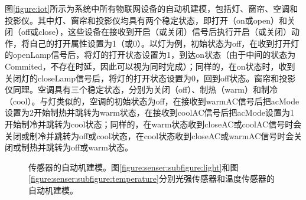 \documentclass[journal, a4paper]{IEEEtran}
\begin{document}
图\ref{figure:iot}所示为系统中所有物联网设备的自动机建模，包括灯、窗帘、空调和投影仪。其中灯、窗帘和投影仪均具有两个稳定状态，即打开（on或open）和关闭（off或close），这些设备在接收到开启（或关闭）信号后执行开启（或关闭）动作，将自己的打开属性设置为1（或0）。以灯为例，初始状态为off，在收到打开灯的openLamp信号后，将灯的打开状态设置为1，到达on状态（由于中间的状态为Commited，不存在时延，因此可以视为同时完成）；同样的，在on状态时，收到关闭灯的closeLamp信号后，将灯的打开状态设置为0，回到off状态。窗帘和投影仪同理。空调具有三个稳定状态，分别为关闭（off）、制热（warm）和制冷（cool）。与灯类似的，空调的初始状态为off，在接收到warmAC信号后把acMode设置为2开始制热并跳转为warm状态，在接收到coolAC信号后把acMode设置为1开始制冷并跳转为cool状态；同样的，在warm状态收到closeAC或coolAC信号时会关闭或制冷并跳转为off或cool状态，在cool状态收到closeAC或warmAC信号时会关闭或制热并跳转为off或warm状态。

\begin{figure}[t]
    \centering
    \caption{传感器的自动机建模。图\ref{figure:senser:subfigure:light}和图\ref{figure:senser:subfigure:temperature}分别光强传感器和温度传感器的自动机建模。}
    \label{figure:senser}
\end{figure}
\end{document}
